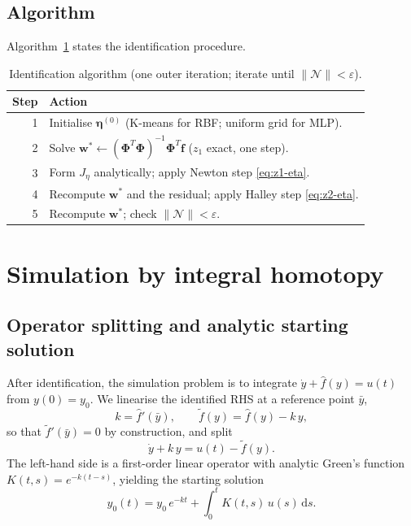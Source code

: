 \documentclass[preprint,12pt,numbers]{elsarticle}
\begin{document}
\subsection{Algorithm}

Algorithm~\ref{alg:identification} states the identification procedure.

\begin{table}[h]
\centering
\caption{Identification algorithm (one outer iteration; iterate until
$\|\mathcal{N}\| < \varepsilon$).}
\label{alg:identification}
\begin{tabular}{rl}
\toprule
\textbf{Step} & \textbf{Action} \\
\midrule
1 & Initialise $\boldsymbol{\eta}^{(0)}$ (K-means for RBF; uniform grid for MLP). \\
2 & Solve $\mathbf{w}^* \leftarrow (\boldsymbol{\Phi}^T\boldsymbol{\Phi})^{-1}\boldsymbol{\Phi}^T\mathbf{f}$
    \quad ($z_1$ exact, one step). \\
3 & Form $J_\eta$ analytically; apply Newton step \eqref{eq:z1-eta}. \\
4 & Recompute $\mathbf{w}^*$ and the residual; apply Halley step \eqref{eq:z2-eta}. \\
5 & Recompute $\mathbf{w}^*$; check $\|\mathcal{N}\| < \varepsilon$. \\
\bottomrule
\end{tabular}
\end{table}


\section{Simulation by integral homotopy}
\label{sec:simulation}

\subsection{Operator splitting and analytic starting solution}

After identification, the simulation problem is to integrate
$\dot{y} + \hat{f}(y) = u(t)$ from $y(0) = y_0$. We linearise the
identified RHS at a reference point $\bar{y}$,
\begin{equation}
k = \hat{f}'(\bar{y}),
\qquad
\tilde{f}(y) = \hat{f}(y) - k\,y,
\end{equation}
so that $\tilde{f}'(\bar{y}) = 0$ by construction, and split
\begin{equation}
\dot{y} + k\,y = u(t) - \tilde{f}(y).
\label{eq:split}
\end{equation}
The left-hand side is a first-order linear operator with analytic Green's
function $K(t,s) = e^{-k(t-s)}$, yielding the starting solution
\begin{equation}
y_0(t) = y_0\,e^{-kt} + \int_0^t K(t,s)\,u(s)\,\mathrm{d}s.
\label{eq:y0}
\end{equation}
\end{document}
